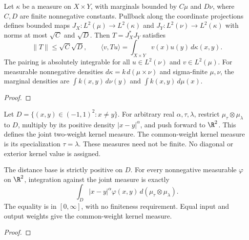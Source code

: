 \begin{supporting}


\begin{theorem}
\label{thm:schur-l2-marginals}
\leanok
Let $\kappa$ be a measure on $X\times Y$, with marginals bounded by
$C\mu$ and $D\nu$, where $C,D$ are finite nonnegative constants.
Pullback along the coordinate projections defines bounded maps
$J_X:L^2(\mu)\to L^2(\kappa)$ and $J_Y:L^2(\nu)\to L^2(\kappa)$
with norms at most $\sqrt C$ and $\sqrt D$.
Then $T=J_X^*J_Y$ satisfies
\[
 \|T\|\le\sqrt C\sqrt D,\qquad
 \langle v,Tu\rangle=\int_{X\times Y}v(x)u(y)\,d\kappa(x,y).
\]
The pairing is absolutely integrable for all $u\in L^2(\nu)$ and
$v\in L^2(\mu)$. For measurable nonnegative densities
$d\kappa=k\,d(\mu\times\nu)$ and sigma-finite $\mu,\nu$, the marginal
densities are $\int k(x,y)\,d\nu(y)$ and $\int k(x,y)\,d\mu(x)$.
\end{theorem}
\begin{proof}
\leanok
\end{proof}

\begin{definition}
\label{def:power-law-kernel-measure}
\leanok
Let $D=\{(x,y)\in(-1,1)^2:x\ne y\}$. For arbitrary real
$\alpha,\tau,\lambda$, restrict $\mu_\tau\otimes\mu_\lambda$ to $D$, multiply by its positive density $|x-y|^\alpha$, and push forward
to $\R^2$. This defines the joint two-weight kernel measure. The common-weight
kernel measure is its specialization $\tau=\lambda$.
These measures need not be finite. No diagonal or exterior kernel value is assigned.
\end{definition}
\begin{theorem}
\label{thm:power-law-kernel-measure}
\leanok
The distance base is strictly positive on $D$. For every nonnegative measurable
$\varphi$ on $\R^2$, integration against the joint measure is exactly
\[
 \int_D |x-y|^\alpha\varphi(x,y)\,d(\mu_\tau\otimes\mu_\lambda).
\]
The equality is in $[0,\infty]$, with no finiteness requirement.
Equal input and output weights give the common-weight kernel measure.
\end{theorem}
\begin{proof}
\leanok
\end{proof}


\end{supporting}
